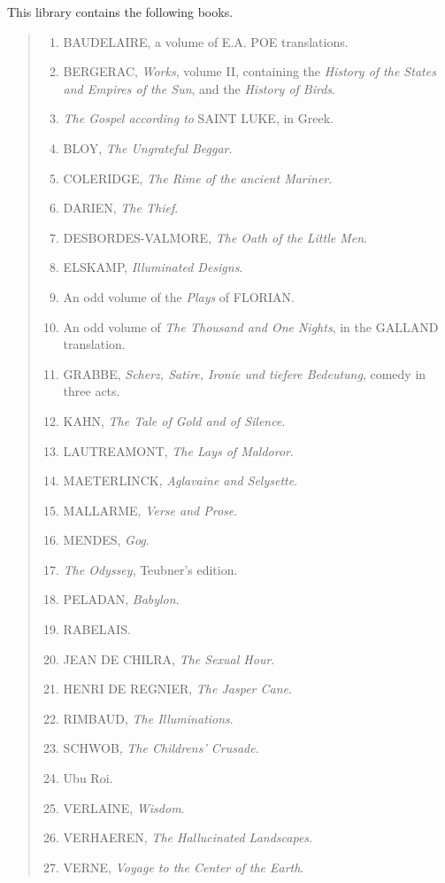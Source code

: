 This library contains the following books.

\begin{quotation}
  \begin{enumerate}
    \item BAUDELAIRE, a volume of E.A. POE translations.
    \item BERGERAC, \textit{Works}, volume II, containing the \textit{History of the States and Empires of the Sun}, and the \textit{History of Birds}.
    \item \textit{The Gospel according to} SAINT LUKE, in Greek.
    \item BLOY, \textit{The Ungrateful Beggar}.
    \item COLERIDGE, \textit{The Rime of the ancient Mariner}.
    \item DARIEN, \textit{The Thief}.
    \item DESBORDES-VALMORE, \textit{The Oath of the Little Men}.
    \item ELSKAMP, \textit{Illuminated Designs}.
    \item An odd volume of the \textit{Plays} of FLORIAN\@.
    \item An odd volume of \textit{The Thousand and One Nights}, in the GALLAND translation.
    \item GRABBE, \textit{Scherz, Satire, Ironie und tiefere Bedeutung}, comedy in three acts.
    \item KAHN, \textit{The Tale of Gold and of Silence}.
    \item LAUTREAMONT, \textit{The Lays of Maldoror}.
    \item MAETERLINCK, \textit{Aglavaine and Selysette}.
    \item MALLARME, \textit{Verse and Prose}.
    \item MENDES, \textit{Gog}.
    \item \textit{The Odyssey}, Teubner's edition.
    \item PELADAN, \textit{Babylon}.
    \item RABELAIS\@.
    \item JEAN DE CHILRA, \textit{The Sexual Hour}.
    \item HENRI DE REGNIER, \textit{The Jasper Cane}.
    \item RIMBAUD, \textit{The Illuminations}.
    \item SCHWOB, \textit{The Childrens' Crusade}.
    \item Ubu Roi.
    \item VERLAINE, \textit{Wisdom}.
    \item VERHAEREN, \textit{The Hallucinated Landscapes}.
    \item VERNE, \textit{Voyage to the Center of the Earth}.
  \end{enumerate}
\end{quotation}



